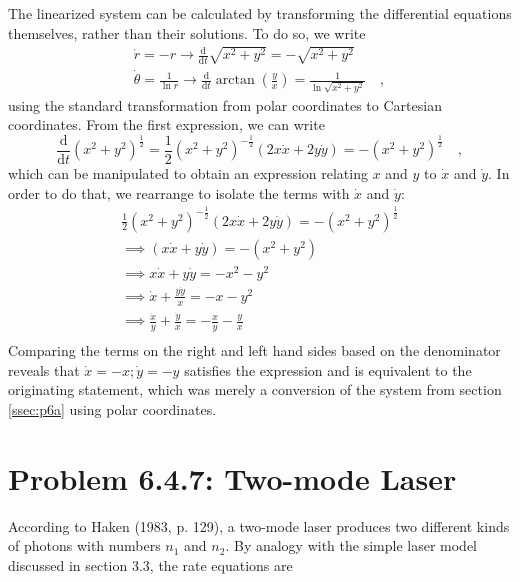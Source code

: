 \documentclass[draft]{agujournal2019}
\begin{document}
The linearized system can be calculated by transforming the differential equations themselves, rather than their solutions. To do so, we write
\begin{align*}
    \dot r = -r \longrightarrow \frac{\mathrm{d}}{\mathrm{d}t} \sqrt{x^2 + y^2} = - \sqrt{x^2 + y^2}\\
    \dot \theta = \frac{1}{\ln{r}} \longrightarrow \frac{\mathrm{d}}{\mathrm{d}t}\arctan{\left(\frac{y}{x}\right)} = \frac{1}{\ln{\sqrt{x^2+y^2}}} \quad ,
\end{align*}
using the standard transformation from polar coordinates to Cartesian coordinates. From the first expression, we can write
\begin{equation*}
    \frac{\mathrm{d}}{\mathrm{d}t} (x^2 + y^2)^\frac{1}{2} = \frac{1}{2}(x^2 + y^2)^{-\frac{1}{2}} (2 x \dot x + 2 y \dot y ) = - (x^2 + y^2)^\frac{1}{2} \quad ,
\end{equation*}
which can be manipulated to obtain an expression relating $x$ and $y$ to $\dot x$ and $\dot y$. In order to do that, we rearrange to isolate the terms with $\dot x$ and $\dot y$:
\begin{align*}
    \frac{1}{2}(x^2 + y^2)^{-\frac{1}{2}} (2 x \dot x + 2 y \dot y ) = - (x^2 + y^2)^\frac{1}{2}\\
    \implies  ( x \dot x +  y \dot y ) = - (x^2 + y^2)\\
    \implies x \dot x + y \dot y = -x^2 - y^2 \\
    \implies \dot x + \frac{y \dot y}{x} = -x - y^2\\
    \implies \frac{\dot x}{y} + \frac{\dot y}{x} = -\frac{x}{y} - \frac{y}{x}\\
\end{align*}
Comparing the terms on the right and left hand sides based on the denominator reveals that $\dot x = -x; \dot y = -y$ satisfies the expression and is equivalent to the originating statement, which was merely a conversion of the system from section \ref{ssec:p6a} using polar coordinates. 

\section{Problem 6.4.7: Two-mode Laser}
\label{sec:p7}

According to Haken (1983, p. 129), a two-mode laser produces two different kinds of photons with numbers $n_1$ and $n_2$. By analogy with the simple laser model discussed in section 3.3, the rate equations are 
\end{document}
